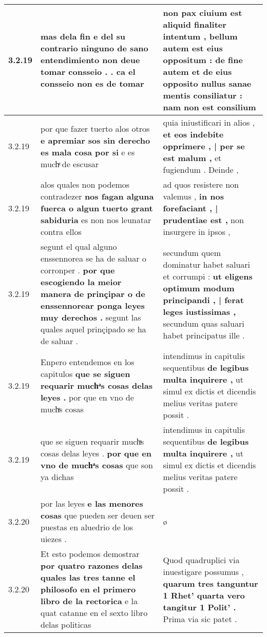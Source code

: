 \begin{tabular}{|p{1cm}|p{6.5cm}|p{6.5cm}|}
3.2.19 & mas dela fin \textbf{ e del su contrario ninguno de sano entendimiento non deue tomar consseio . . } ca el consseio non es de tomar & non pax ciuium est aliquid finaliter intentum , bellum autem est eius oppositum : \textbf{ de fine autem et de eius opposito nullus sanae mentis consiliatur : } nam non est consilium \\\hline
3.2.19 & por que fazer tuerto alos otros \textbf{ e apremiar sos sin derecho es mala cosa por si } e es muchͣ de escusar & quia iniustificari in alios , \textbf{ et eos indebite opprimere , | per se est malum , } et fugiendum . Deinde , \\\hline
3.2.19 & alos quales non podemos contradezer \textbf{ nos fagan alguna fuerca o algun tuerto grant sabiduria } es non nos leunatar contra ellos & ad quos resistere non valemus , \textbf{ in nos forefaciant , | prudentiae est , } non insurgere in ipsos , \\\hline
3.2.19 & segunt el qual alguno enssennorea se ha de saluar o corronper . \textbf{ por que escogiendo la meior manera de prinçipar o de enssennorear ponga leyes muy derechos . } segunt las quales aquel prinçipado se ha de saluar . & secundum quem dominatur habet saluari et corrumpi : \textbf{ ut eligens optimum modum principandi , | ferat leges iustissimas , } secundum quas saluari habet principatus ille . \\\hline
3.2.19 & Enpero entendemos en los capitulos \textbf{ que se siguen requarir muchͣs cosas delas leyes . } por que en vno de muchͣs cosas & intendimus in capitulis sequentibus \textbf{ de legibus multa inquirere , } ut simul ex dictis et dicendis melius veritas patere possit . \\\hline
3.2.19 & que se siguen requarir muchͣs cosas delas leyes . \textbf{ por que en vno de muchͣs cosas } que son ya dichas & intendimus in capitulis sequentibus \textbf{ de legibus multa inquirere , } ut simul ex dictis et dicendis melius veritas patere possit . \\\hline
3.2.20 & por las leyes \textbf{ e las menores cosas } que pueden ser deuen ser puestas en aluedrio de los uiezes . & ø \\\hline
3.2.20 & Et esto podemos demostrar \textbf{ por quatro razones delas quales las tres tanne el philosofo en el primero libro de la rectorica } e la quat catanne en el sexto libro delas politicas & Quod quadruplici via inuestigare possumus , \textbf{ quarum tres tanguntur 1 Rhet’ quarta vero tangitur 1 Polit’ . } Prima via sic patet . \\\hline

\end{tabular}

